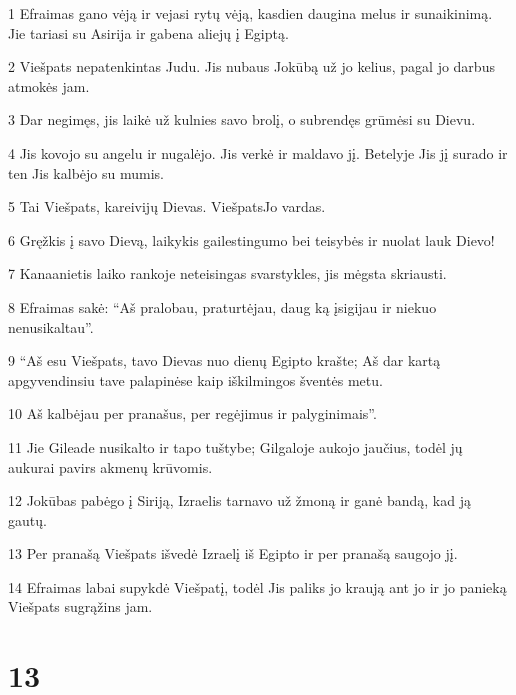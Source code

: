 \par 1 Efraimas gano vėją ir vejasi rytų vėją, kasdien daugina melus ir sunaikinimą. Jie tariasi su Asirija ir gabena aliejų į Egiptą. 
\par 2 Viešpats nepatenkintas Judu. Jis nubaus Jokūbą už jo kelius, pagal jo darbus atmokės jam. 
\par 3 Dar negimęs, jis laikė už kulnies savo brolį, o subrendęs grūmėsi su Dievu. 
\par 4 Jis kovojo su angelu ir nugalėjo. Jis verkė ir maldavo jį. Betelyje Jis jį surado ir ten Jis kalbėjo su mumis. 
\par 5 Tai Viešpats, kareivijų Dievas. Viešpats­Jo vardas. 
\par 6 Gręžkis į savo Dievą, laikykis gailestingumo bei teisybės ir nuolat lauk Dievo! 
\par 7 Kanaanietis laiko rankoje neteisingas svarstykles, jis mėgsta skriausti. 
\par 8 Efraimas sakė: “Aš pralobau, praturtėjau, daug ką įsigijau ir niekuo nenusikaltau”. 
\par 9 “Aš esu Viešpats, tavo Dievas nuo dienų Egipto krašte; Aš dar kartą apgyvendinsiu tave palapinėse kaip iškilmingos šventės metu. 
\par 10 Aš kalbėjau per pranašus, per regėjimus ir palyginimais”. 
\par 11 Jie Gileade nusikalto ir tapo tuštybe; Gilgaloje aukojo jaučius, todėl jų aukurai pavirs akmenų krūvomis. 
\par 12 Jokūbas pabėgo į Siriją, Izraelis tarnavo už žmoną ir ganė bandą, kad ją gautų. 
\par 13 Per pranašą Viešpats išvedė Izraelį iš Egipto ir per pranašą saugojo jį. 
\par 14 Efraimas labai supykdė Viešpatį, todėl Jis paliks jo kraują ant jo ir jo panieką Viešpats sugrąžins jam.



\chapter{13}


